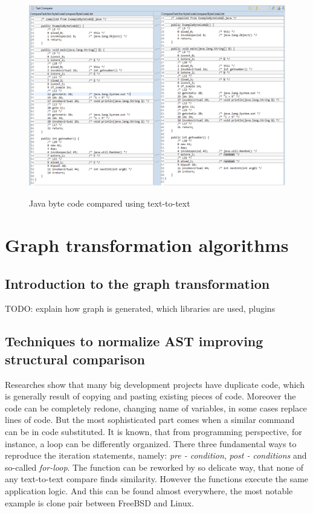 \documentclass{report}
\begin{document}
\begin{figure}[h]
  \centering
  \includegraphics[scale = 0.55]{Figures/bytecode-compare/example-of-bytecode-text-compared}\\[0.1cm]
  \caption[Functions compared by members]{Java byte code compared using text-to-text}
  \label{fig:example-of-bytecode-text-compared}
\end{figure}



\chapter{Graph transformation algorithms}
\label{cha:graph-transformation}

\section{Introduction to the graph transformation}
\label{sec:graph-transformation}

TODO: explain how graph is generated, which libraries are used, plugins

\section{Techniques to normalize AST improving structural comparison}

Researches show that many big development projects have duplicate code, which is generally result of copying and pasting existing pieces of code. Moreover the code can be completely redone, changing name of variables, in some cases replace lines of code. But the most sophisticated part comes when a similar command can be in code substituted. It is known, that from programming perspective, for instance, a loop can be differently organized. There three fundamental ways to reproduce the iteration statements, namely: \emph{pre - condition}, \emph{post - conditions} and so-called \emph{for-loop}. The function can be reworked by so delicate way, that none of any text-to-text compare finds similarity. However the functions execute the same application logic. And this can be found almost everywhere, the most notable example is clone pair between FreeBSD and Linux. 
\end{document}
